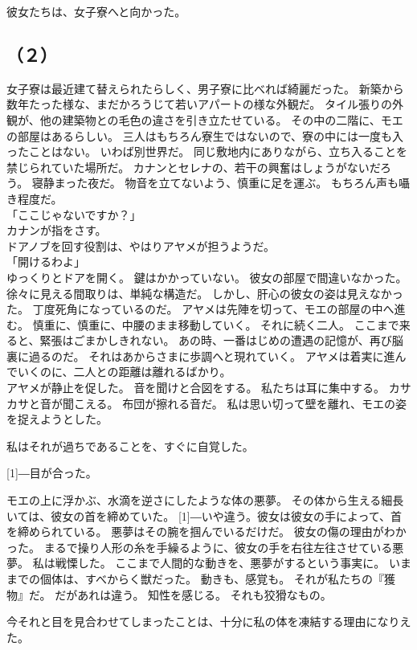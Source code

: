 \documentclass[../IHMain]{subfiles}
\begin{document}
彼女たちは、女子寮へと向かった。

\subsection*{（２）}
女子寮は最近建て替えられたらしく、男子寮に比べれば綺麗だった。
新築から数年たった様な、まだかろうじて若いアパートの様な外観だ。
タイル張りの外観が、他の建築物との毛色の違さを引き立たせている。
その中の二階に、モエの部屋はあるらしい。
三人はもちろん寮生ではないので、寮の中には一度も入ったことはない。
いわば別世界だ。
同じ敷地内にありながら、立ち入ることを禁じられていた場所だ。
カナンとセレナの、若干の興奮はしょうがないだろう。
寝静まった夜だ。
物音を立てないよう、慎重に足を運ぶ。
もちろん声も囁き程度だ。\\
「ここじゃないですか？」\\
カナンが指をさす。\\
ドアノブを回す役割は、やはりアヤメが担うようだ。\\
「開けるわよ」\\
ゆっくりとドアを開く。
鍵はかかっていない。
彼女の部屋で間違いなかった。
徐々に見える間取りは、単純な構造だ。
しかし、肝心の彼女の姿は見えなかった。
丁度死角になっているのだ。
アヤメは先陣を切って、モエの部屋の中へ進む。
慎重に、慎重に、中腰のまま移動していく。
それに続く二人。
ここまで来ると、緊張はごまかしきれない。
あの時、一番はじめの遭遇の記憶が、再び脳裏に過るのだ。
それはあからさまに歩調へと現れていく。
アヤメは着実に進んでいくのに、二人との距離は離れるばかり。\\

アヤメが静止を促した。
音を聞けと合図をする。
私たちは耳に集中する。
カサカサと音が聞こえる。
布団が擦れる音だ。
私は思い切って壁を離れ、モエの姿を捉えようとした。

私はそれが過ちであることを、すぐに自覚した。

\scalebox{3}[1]{―}目が合った。

モエの上に浮かぶ、水滴を逆さにしたような体の悪夢。
その体から生える細長いては、彼女の首を締めていた。
\scalebox{3}[1]{―}いや違う。彼女は彼女の手によって、首を締められている。
悪夢はその腕を掴んでいるだけだ。
彼女の傷の理由がわかった。
まるで操り人形の糸を手繰るように、彼女の手を右往左往させている悪夢。
私は戦慄した。
ここまで人間的な動きを、悪夢がするという事実に。
いままでの個体は、すべからく獣だった。
動きも、感覚も。
それが私たちの『獲物』だ。
だがあれは違う。
知性を感じる。
それも狡猾なもの。

今それと目を見合わせてしまったことは、十分に私の体を凍結する理由になりえた。\\
\end{document}
